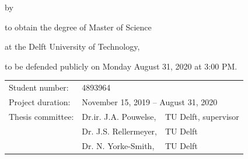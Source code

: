 \begin{titlepage}


\begin{center}


{\makeatletter
\fontsize{64}{64}\selectfont\@title\par
\makeatother}

\bigskip

{\makeatletter
\ifx\@subtitle\undefined\else
    \bigskip
   {\fontsize{32}{42}\selectfont\@subtitle\par}
\fi
\makeatother}

\bigskip
\bigskip

by

\bigskip
\bigskip

{\makeatletter
\fontsize{26}{26}\selectfont\@author
\makeatother}

\bigskip
\bigskip

to obtain the degree of Master of Science

at the Delft University of Technology,

to be defended publicly on Monday August 31, 2020 at 3:00 PM.

\vfill

\begin{tabular}{lll}
    Student number: & 4893964 \\
    Project duration: & \multicolumn{2}{l}{November 15, 2019 -- August 31, 2020} \\
    Thesis committee: & Dr.ir. J.A. Pouwelse, & TU Delft, supervisor \\
        & Dr. J.S. Rellermeyer, & TU Delft \\
        & Dr. N. Yorke-Smith, & TU Delft
\end{tabular}

\bigskip
\bigskip


\end{center}
\end{titlepage}
